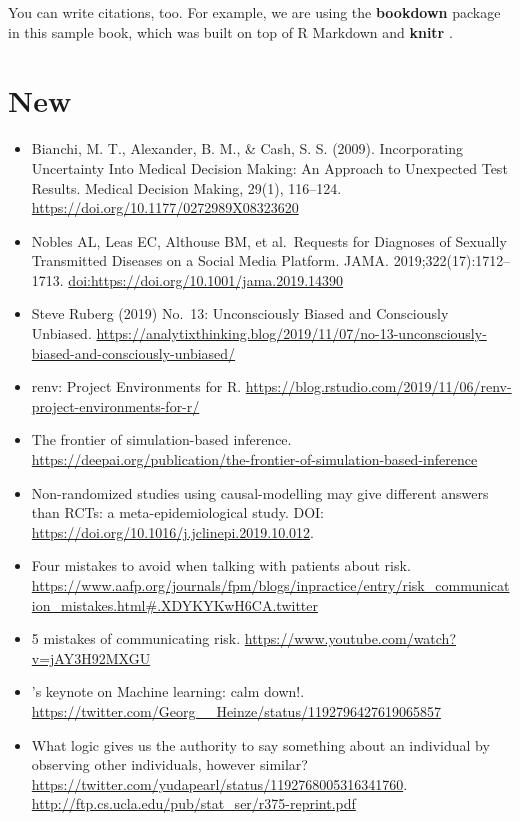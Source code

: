 \documentclass[]{book}
\begin{document}
You can write citations, too. For example, we are using the \textbf{bookdown} package \citep{R-bookdown} in this sample book, which was built on top of R Markdown and \textbf{knitr} \citep{xie2015}.

\hypertarget{new}{%
\chapter{New}\label{new}}

\begin{itemize}
\item
  Bianchi, M. T., Alexander, B. M., \& Cash, S. S. (2009). Incorporating Uncertainty Into Medical Decision Making: An Approach to Unexpected Test Results. Medical Decision Making, 29(1), 116--124. \url{https://doi.org/10.1177/0272989X08323620}
\item
  Nobles AL, Leas EC, Althouse BM, et al.~Requests for Diagnoses of Sexually Transmitted Diseases on a Social Media Platform. JAMA. 2019;322(17):1712--1713. \url{doi:https://doi.org/10.1001/jama.2019.14390}
\item
  Steve Ruberg (2019) No.~13: Unconsciously Biased and Consciously Unbiased. \url{https://analytixthinking.blog/2019/11/07/no-13-unconsciously-biased-and-consciously-unbiased/}
\item
  renv: Project Environments for R. \url{https://blog.rstudio.com/2019/11/06/renv-project-environments-for-r/}
\item
  The frontier of simulation-based inference. \url{https://deepai.org/publication/the-frontier-of-simulation-based-inference}
\item
  Non-randomized studies using causal-modelling may give different answers than RCTs: a meta-epidemiological study. DOI: \url{https://doi.org/10.1016/j.jclinepi.2019.10.012}.
\item
  Four mistakes to avoid when talking with patients about risk. \url{https://www.aafp.org/journals/fpm/blogs/inpractice/entry/risk_communication_mistakes.html\#.XDYKYKwH6CA.twitter}
\item
  5 mistakes of communicating risk. \url{https://www.youtube.com/watch?v=jAY3H92MXGU}
\item
  \citet{BenVanCalster}'s keynote on Machine learning: calm down!. \url{https://twitter.com/Georg__Heinze/status/1192796427619065857}
\item
  What logic gives us the authority to say something about an individual by observing other individuals, however similar? \url{https://twitter.com/yudapearl/status/1192768005316341760}. \url{http://ftp.cs.ucla.edu/pub/stat_ser/r375-reprint.pdf}

\end{itemize}
\end{document}
